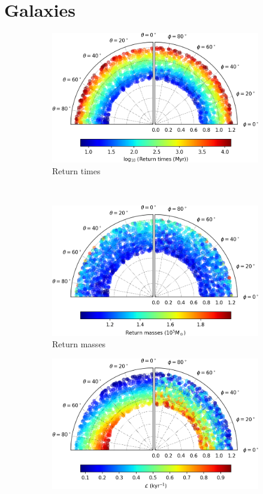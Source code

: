 \chapter{Galaxies}

\begin{figure}[h]
    \centering
    \begin{subfigure}[t]{0.4\textwidth}
        \includegraphics[width = \textwidth]{"../Files/Week 13/images/20_time"}
        \caption{Return times}
    \end{subfigure}
    ~ 
    \begin{subfigure}[t]{0.4\textwidth}
        \includegraphics[width=\textwidth]{"../Files/Week 13/images/20_mass"}
        \caption{Return masses}
    \end{subfigure}
    \begin{subfigure}[t]{0.4\textwidth}
        \includegraphics[width=\textwidth]{"../Files/Week 13/images/20_lyapunov"}

\end{subfigure}
\end{figure}
